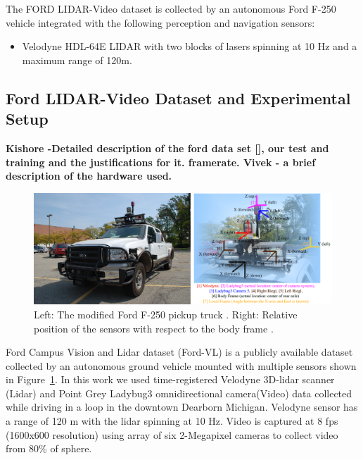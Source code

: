 \documentclass{article}
\begin{document}
The FORD LIDAR-Video dataset \cite{Pandey2011Ford-campu} is collected by an autonomous Ford F-250 vehicle integrated with the following perception and navigation sensors:
\begin{itemize}
    \item Velodyne HDL-64E LIDAR with two blocks of lasers spinning at 10 Hz and a maximum range of 120m.
\end{itemize}


\subsection{Ford LIDAR-Video Dataset and Experimental Setup} %
\label{sub:ford_lidar_video_dataset_and_experimental_setup}

\textbf{ Kishore -Detailed description of the ford data set [], our test and training and the justifications for it. framerate. 
Vivek - a brief description of the hardware used. }

\begin{figure}[htbp]
    \centering
        \includegraphics[scale=0.45]{Figures/ford-truck-sensors.png}
    \caption{Left: The modified Ford F-250 pickup truck \cite{Pandey2011Ford-campu}. Right: Relative position of the sensors with respect to the body frame \cite{Pandey2011Ford-campu}.}
    \label{fig:ford-truck-sensors}
\end{figure}

Ford Campus Vision and Lidar dataset \citep{Pandey2011Ford-campu} (Ford-VL) is a publicly available dataset collected by an autonomous ground vehicle mounted with multiple sensors shown in Figure~\ref{fig:ford-truck-sensors}. In this work we used time-registered Velodyne 3D-lidar scanner (Lidar) and Point Grey Ladybug3 omnidirectional camera(Video) data collected while driving in a loop in the downtown Dearborn Michigan. Velodyne sensor has a range of 120 m with the lidar spinning at 10 Hz. Video is captured at 8 fps (1600x600 resolution) using array of six 2-Megapixel cameras to collect video from 80\% of sphere.  
\end{document}
